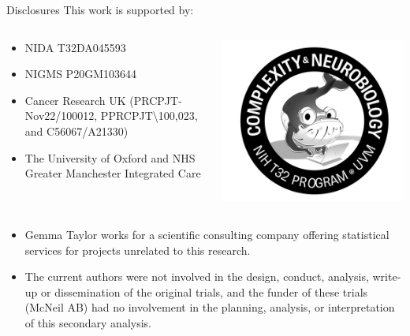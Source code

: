 \documentclass[aspectratio=169]{beamer}
\begin{document}
\begin{frame}{Disclosures}
	This work is supported by:
	\begin{columns}
		\begin{column}{0.75\textwidth}
			\begin{itemize}
				\small
				\item  NIDA T32DA045593
				\item NIGMS P20GM103644
				\item Cancer Research UK (PRCPJT-Nov22/100012, PPRCPJT\textbackslash100,023, and C56067/A21330)
				\item The University of Oxford and  NHS Greater Manchester Integrated Care
			\end{itemize}

		\end{column}
		\begin{column}{0.25\textwidth}
			\includegraphics[width=\columnwidth]{complexbrain}
		\end{column}
	\end{columns}
	
	\vspace{1em}
	
	\begin{itemize}
		\scriptsize
		\item 	Gemma Taylor works for a scientific consulting company offering statistical services for projects unrelated to this research.
		\item The current authors were not involved in the design, conduct, analysis, write-up or dissemination of the original trials, and the funder of these trials (McNeil AB) had no involvement in the planning, analysis, or interpretation of this secondary analysis.
	\end{itemize}

	
	
\end{frame}
\end{document}
